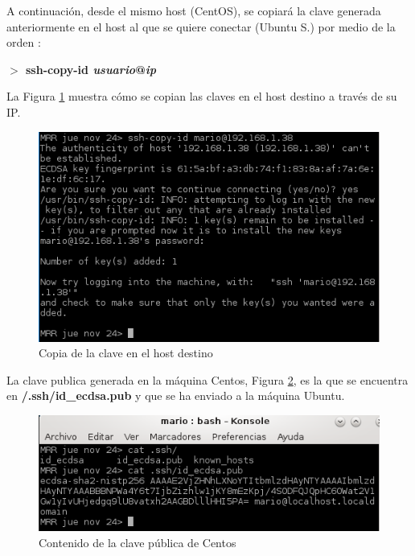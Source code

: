 A continuación, desde el mismo host (CentOS), se copiará la clave generada anteriormente
en el host al que se quiere conectar (Ubuntu S.) por medio de la orden \cite{enlace18}:

\textbf{$ > $ ssh-copy-id \textit{usuario}@\textit{ip}}

\newpage

La Figura \ref{fig:figura98} muestra cómo se copian las claves en el host destino a través de su IP.

\begin{figure}[H] %
	\centering
	\includegraphics[scale=0.9]{figuras/figura98.png} 
	\caption{Copia de la clave en el host destino} 
	\label{fig:figura98}
\end{figure}

La clave publica generada en la máquina Centos, Figura \ref{fig:figura99}, es la que se encuentra en \textbf{\AC/.ssh/id\_ecdsa.pub} y que se ha enviado a la máquina Ubuntu.

\begin{figure}[H] %
	\centering
	\includegraphics[scale=1]{figuras/figura99.png} 
	\caption{Contenido de la clave pública de Centos} 
	\label{fig:figura99}
\end{figure}

